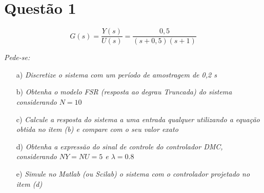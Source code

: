\chapter*{Questão 1}

\begin{equation}\nonumber
G(s) = \frac{Y(s)}{U(s)} = \frac{0,5}{(s+0,5)(s+1)}
\end{equation}

{\it Pede-se:}

\begin{itemize}
    \item[a)] {\it Discretize o sistema com um período de amostragem de 0,2 s}
    \item[b)] {\it Obtenha o modelo FSR (resposta ao degrau Truncada) do sistema
              considerando $N = 10$}
    \item[c)] {\it Calcule a resposta do sistema a uma entrada qualquer
              utilizando a equação obtida no item (b) e compare com o seu valor 
              exato}
    \item[d)] {\it Obtenha a expressão do sinal de controle do controlador DMC,
              considerando $NY = NU = 5$ e $\lambda = 0.8$}
    \item[e)] {\it Simule no Matlab (ou Scilab) o sistema com o controlador
              projetado no item (d)}
\end{itemize}

\vspace{0.5cm}


\vspace{0.25cm}

\cite{dorf:2009}
